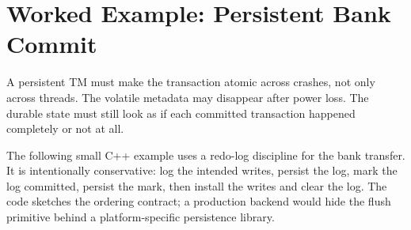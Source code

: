 \section{Worked Example: Persistent Bank Commit}

A persistent TM must make the transaction atomic across crashes, not only across threads. The volatile metadata may disappear after power loss. The durable state must still look as if each committed transaction happened completely or not at all.

The following small C++ example uses a redo-log discipline for the bank transfer. It is intentionally conservative: log the intended writes, persist the log, mark the log committed, persist the mark, then install the writes and clear the log. The code sketches the ordering contract; a production backend would hide the flush primitive behind a platform-specific persistence library.

